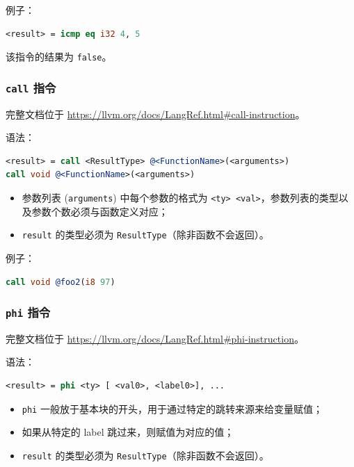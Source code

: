 例子：
\begin{lstlisting}[language=llvm]
<result> = icmp eq i32 4, 5
\end{lstlisting}

该指令的结果为 \texttt{false}。

\subsubsection{\texttt{call} 指令}\label{LLVM-call-instructions}

\begin{remark}
完整文档位于 \url{https://llvm.org/docs/LangRef.html\#call-instruction}。
\end{remark}

语法：
\begin{lstlisting}[language=llvm]
<result> = call <ResultType> @<FunctionName>(<arguments>)
call void @<FunctionName>(<arguments>)
\end{lstlisting}

\begin{itemize}
  \item 参数列表 (\texttt{arguments}) 中每个参数的格式为
    \texttt{<ty> <val>}，参数列表的类型以及参数个数必须与函数定义对应；
  \item \texttt{result} 的类型必须为 \texttt{ResultType}（除非函数不会返回）。
\end{itemize}

例子：
\begin{lstlisting}[language=llvm]
%result = call i32 @foo1(i32 %arg1)
call void @foo2(i8 97)
\end{lstlisting}

\subsubsection{\texttt{phi} 指令}\label{LLVM-phi-instructions}

\begin{remark}
完整文档位于 \url{https://llvm.org/docs/LangRef.html\#phi-instruction}。
\end{remark}

语法：
\begin{lstlisting}[language=llvm]
<result> = phi <ty> [ <val0>, <label0>], ...
\end{lstlisting}

\begin{itemize}
  \item \texttt{phi} 一般放于基本块的开头，用于通过特定的跳转来源来给变量赋值；
  \item 如果从特定的 label 跳过来，则赋值为对应的值；
  \item \texttt{result} 的类型必须为 \texttt{ResultType}（除非函数不会返回）。
\end{itemize}

